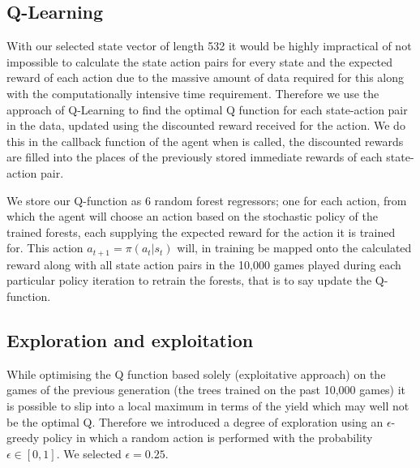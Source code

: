	\subsection{Q-Learning}
	With our selected state vector of length 532 it would be highly impractical of not impossible to calculate the state action pairs for every state and the expected reward of each action due to the massive amount of data required for this along with the computationally intensive time requirement. Therefore we use the approach of Q-Learning to find the optimal Q function for each state-action pair in the data, updated using the discounted reward received for the action. We do this in the callback function of the agent when  is called, the discounted rewards are filled into the places of the previously stored immediate rewards of each state-action pair. 
	
	We store our Q-function as 6 random forest regressors; one for each action, from which the agent will choose an action based on the stochastic policy of the trained forests, each supplying the expected reward for the action it is trained for. This action $a_{t+1} = \pi(a_t|s_t)$ will, in training be mapped onto the calculated reward along with all state action pairs in the 10,000 games played during each particular policy iteration to retrain the forests, that is to say update the Q-function.
	
	\subsection{Exploration and exploitation}
	While optimising the Q function based solely (exploitative approach) on the games of the previous generation (the trees trained on the past 10,000 games) it is possible to slip into a local maximum in terms of the yield which may well not be the optimal Q. Therefore we introduced a degree of exploration using an $\epsilon$-greedy policy in which a random action is performed with the probability $\epsilon \in [0,1]$. We selected $\epsilon = 0.25$. \par
	
